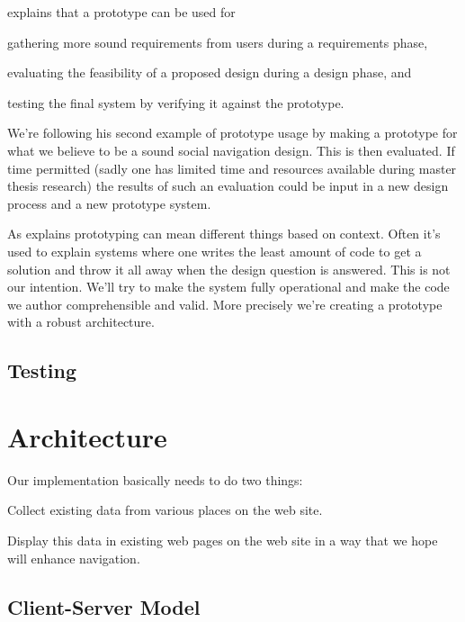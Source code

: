 \citet[pp.~409--410]{sommerville07} explains that a prototype can be used for
\begin{inparaenum}[(i)]
  \item gathering more sound requirements from users during a
    requirements phase,
  \item evaluating the feasibility of a proposed design during a
    design phase, and
  \item testing the final system by verifying it against the prototype.
\end{inparaenum}
We're following his second example of prototype usage by making a prototype
for what we believe to be a sound social navigation design. This is then
evaluated. If time permitted (sadly one has limited time and resources
available during master thesis research) the results of such an evaluation
could be input in a new design process and a new prototype system.

As \citet[p.~114]{mcconnell04} explains prototyping can mean different things
based on context. Often it's used to explain systems where one writes the
least amount of code to get a solution and throw it all away when the design
question is answered. This is not our intention. We'll try to make the system
fully operational and make the code we author comprehensible and
valid. More precisely we're creating a  prototype
\cite[p.~78]{rudd96} with a robust architecture.

\subsection{Testing}


\section{Architecture}

Our implementation basically needs to do two things:

\begin{enum}
  \item Collect existing data from various places on the \urort{} web site.
  \item Display this data in existing web pages on the \urort{} web site in
    a way that we hope will enhance navigation.
\end{enum}

\subsection{Client-Server Model}

